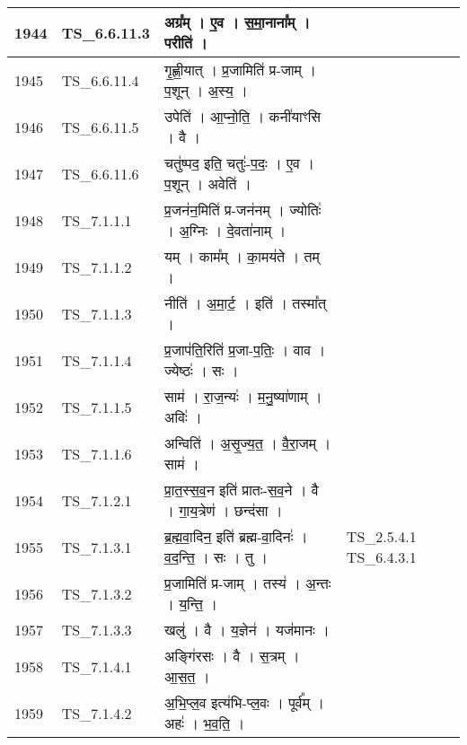 \documentclass[17pt]{extarticle}
\begin{document}
\begin{longtable}{||p{0.4in}||p{0.9in}||p{4.0in}||p{0.9in}||}
        \hline
            1944 & TS\_6.6.11.3 & अग्र᳚म्   ।   ए॒व   ।   स॒मा॒नाना᳚म्   ।   परीति॑   ।    &      \\
        \hline
            1945 & TS\_6.6.11.4 & गृ॒ह्णी॒यात्   ।   प्र॒जामिति॑ प्र{-}जाम्   ।   प॒शून्   ।   अ॒स्य॒   ।    &      \\
        \hline
            1946 & TS\_6.6.11.5 & उपेति॑   ।   आ॒प्नो॒ति॒   ।   कनी॑याꣳसि   ।   वै   ।    &      \\
        \hline
            1947 & TS\_6.6.11.6 & चतु॑ष्पद॒ इति॒ चतुः॑{-}प॒दः॒   ।   ए॒व   ।   प॒शून्   ।   अवेति॑   ।    &      \\
        \hline
            1948 & TS\_7.1.1.1 & प्र॒जन॑न॒मिति॑ प्र{-}जन॑नम्   ।   ज्योतिः॑   ।   अ॒ग्निः   ।   दे॒वता॑नाम्   ।    &      \\
        \hline
            1949 & TS\_7.1.1.2 & यम्   ।   काम᳚म्   ।   का॒मय॑ते   ।   तम्   ।    &      \\
        \hline
            1950 & TS\_7.1.1.3 & नीति॑   ।   अ॒मा॒र्ट॒   ।   इति॑   ।   तस्मा᳚त्   ।    &      \\
        \hline
            1951 & TS\_7.1.1.4 & प्र॒जाप॑ति॒रिति॑ प्र॒जा{-}प॒तिः॒   ।   वाव   ।   ज्येष्ठः॑   ।   सः   ।    &      \\
        \hline
            1952 & TS\_7.1.1.5 & साम॑   ।   रा॒ज॒न्यः॑   ।   म॒नु॒ष्या॑णाम्   ।   अविः॑   ।    &      \\
        \hline
            1953 & TS\_7.1.1.6 & अन्विति॑   ।   अ॒सृ॒ज्य॒त॒   ।   वै॒रा॒जम्   ।   साम॑   ।    &      \\
        \hline
            1954 & TS\_7.1.2.1 & प्रा॒त॒स्स॒व॒न इति॑ प्रातः{-}स॒व॒ने   ।   वै   ।   गा॒य॒त्रेण॑   ।   छन्द॑सा   ।    &      \\
        \hline
            1955 & TS\_7.1.3.1 & ब्र॒ह्म॒वा॒दिन॒ इति॑ ब्रह्म{-}वा॒दिनः॑   ।   व॒द॒न्ति॒   ।   सः   ।   तु   ।    & TS\_2.5.4.1 TS\_6.4.3.1        \\
        \hline
            1956 & TS\_7.1.3.2 & प्र॒जामिति॑ प्र{-}जाम्   ।   तस्य॑   ।   अ॒न्तः   ।   य॒न्ति॒   ।    &      \\
        \hline
            1957 & TS\_7.1.3.3 & खलु॑   ।   वै   ।   य॒ज्ञेन॑   ।   यज॑मानः   ।    &      \\
        \hline
            1958 & TS\_7.1.4.1 & अङ्गि॑रसः   ।   वै   ।   स॒त्रम्   ।   आ॒स॒त॒   ।    &      \\
        \hline
            1959 & TS\_7.1.4.2 & अ॒भि॒प्ल॒व इत्य॑भि{-}प्ल॒वः   ।   पूर्व᳚म्   ।   अहः॑   ।   भ॒व॒ति॒   ।    &      \\

\end{longtable}
\end{document}
